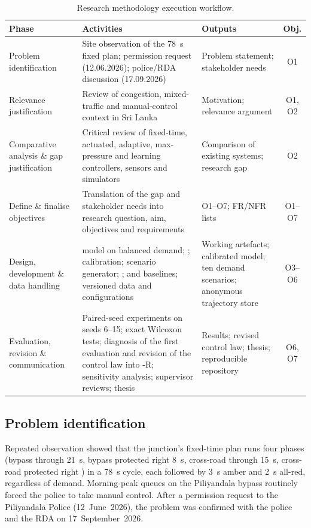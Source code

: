 \begin{table}[htbp]
\centering
\caption{Research methodology execution workflow.}
\label{tab:method-workflow}
\small
{}
\begin{tabularx}{\textwidth}{@{}>{\raggedright\arraybackslash}p{2.7cm}>{\raggedright\arraybackslash}X>{\raggedright\arraybackslash}p{3.6cm}c@{}}
\toprule
\textbf{Phase} & \textbf{Activities} & \textbf{Outputs} & \textbf{Obj.}\\
\midrule
Problem identification & Site observation of the 78~s fixed plan; permission request (12.06.2026); police/RDA discussion (17.09.2026) & Problem statement; stakeholder needs & O1\\
\addlinespace
Relevance justification & Review of congestion, mixed-traffic and manual-control context in Sri Lanka & Motivation; relevance argument & O1, O2\\
\addlinespace
Comparative analysis \& gap justification & Critical review of fixed-time, actuated, adaptive, max-pressure and learning controllers, sensors and simulators & Comparison of existing systems; research gap & O2\\
\addlinespace
Define \& finalise objectives & Translation of the gap and stakeholder needs into research question, aim, objectives and requirements & O1--O7; FR/NFR lists & O1--O7\\
\addlinespace
Design, development \& data handling & \sumo{} model on balanced demand; \dtx{}; calibration; scenario generator; \vls{}; \prism{} and baselines; versioned data and configurations & Working artefacts; calibrated model; ten demand scenarios; anonymous trajectory store & O3--O6\\
\addlinespace
Evaluation, revision \& communication & Paired-seed experiments on seeds 6--15; exact Wilcoxon tests; diagnosis of the first evaluation and revision of the control law into \prism{}-R; sensitivity analysis; supervisor reviews; thesis & Results; revised control law; thesis; reproducible repository & O6, O7\\
\bottomrule
\end{tabularx}
\end{table}

\subsection{Problem identification}
Repeated observation showed that the junction's fixed-time plan runs four phases (bypass through 21~s, bypass protected right 8~s, cross-road through 15~s, cross-road protected right ) in a 78~s cycle, each followed by 3~s amber and 2~s all-red, regardless of demand. Morning-peak queues on the Piliyandala bypass routinely forced the police to take manual control. After a permission request to the Piliyandala Police (12~June~2026), the problem was confirmed with the police and the RDA on 17~September~2026.


